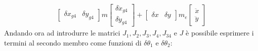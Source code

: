 \begin{equation}
\begin{split}
\begin{bmatrix}
\delta x_{g4} & \delta y_{g4}
\end{bmatrix}m\begin{bmatrix}
\delta \ddot{x}_{g4} \\ \delta \ddot{y}_{g4} \end{bmatrix} + \begin{bmatrix}
\delta x & \delta y
\end{bmatrix}m_e \begin{bmatrix}
\ddot{x} \\ \ddot{y}
\end{bmatrix}
\end{split}
\label{eq:DinamicaGrande}
\end{equation}
Andando ora ad introdurre le matrici $J_1, J_2, J_3, J_4, J_{34}$ e $J$ è possibile esprimere i termini al secondo membro come funzioni di $\delta\theta_1$ e $\delta\theta_2$:
